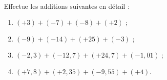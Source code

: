\begin{exercice}
\begin{minipage}[c]{0.48\linewidth}
\begin{center} \boxed{\phantom{hello}} \end{center}
\vspace{-0.69cm}
\begin{center}  \negthinspace \boxed{\phantom{hello}} \end{center}
\vspace{-0.71cm}
\begin{center} \boxed{\phantom{hello}} \negthinspace {} \negthinspace  \boxed{\phantom{hello}} \end{center}
\vspace{-0.71cm}
\begin{center} \negthinspace \boxed{\phantom{hello}} \negthinspace {} \negthinspace \boxed{\phantom{hello}} \negthinspace {} \end{center}
 \end{minipage} \hfill%
 \begin{minipage}[c]{0.48\linewidth}
\begin{center}  \end{center}
\vspace{-0.69cm}
\begin{center}  \negthinspace \boxed{\phantom{hello}} \end{center}
\vspace{-0.71cm}
\begin{center} \boxed{\phantom{hello}} \negthinspace {} \negthinspace \boxed{\phantom{hello}} \end{center}
\vspace{-0.71cm}
\begin{center} \boxed{\phantom{hello}} \negthinspace \boxed{\phantom{hello}} \negthinspace \boxed{\phantom{hello}} \negthinspace {} \end{center}
  \end{minipage} \\
\end{exercice}


\begin{exercice}
Effectue les additions suivantes en détail :
\begin{enumerate}
 \item $(+3) + (-7) + (-8) + (+2)$ ;
 \item $(-9) + (-14) + (+25) + (-3)$ ;
 \item $(-2,3) + (-12,7) + (+24,7) + (-1,01)$ ;
 \item $(+7,8) + (+2,35) + (-9,55) + (+4)$.
 \end{enumerate}
\end{exercice}


